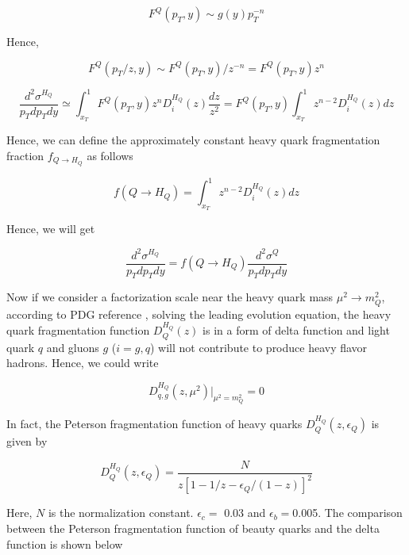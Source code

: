\begin{equation}
F^Q(p_T, y) \sim g(y) p_T^{-n}
\end{equation}

Hence,

\begin{equation}
F^Q(p_T/z, y) \sim F^Q(p_T, y)/z^{-n} = F^Q(p_T, y) z^n
\end{equation}


\begin{equation}
\frac{d^2\sigma^{H_Q}}{p_T dp_Tdy} \simeq \int_{x_T}^1 F^Q(p_T, y)  z^{n} D^{H_Q}_{i}(z) \frac{dz}{z^2} =F^Q(p_T, y)  \int_{x_T}^1  z^{n-2} D^{H_Q}_{i}(z) dz
\end{equation}



Hence, we can define the approximately constant heavy quark fragmentation fraction $f_{Q \rightarrow H_Q}$ as follows

\begin{equation}
f(Q \rightarrow H_Q) = \int_{x_T}^1 z^{n-2} D^{H_Q}_{i}(z) dz
\end{equation}

Hence, we will get 

\begin{equation}
\frac{d^2\sigma^{H_Q}}{p_T dp_T dy} = f(Q \rightarrow H_Q)  \frac{d^2\sigma^Q}{p_T dp_T dy}
\end{equation}

\fi

Now if we consider a factorization scale near the heavy quark mass $\mu^2 \rightarrow m_Q^2$, according to PDG reference \cite{AlphaTheoEx}, solving the leading evolution equation, the heavy quark fragmentation function $D_Q^{H_Q}(z)$ is in a form of delta function and light quark $q$ and gluons $g$ ($i = g, q$) will not contribute to produce heavy flavor hadrons. Hence, we could write

\begin{equation}
D^{H_Q}_{q,g}(z,\mu^2)|_{\mu^2=m_Q^2} = 0
\end{equation}

In fact, the Peterson fragmentation function of heavy quarks $D^{H_Q}_Q(z,\epsilon_Q)$ is given by \cite{Peterson}

\begin{equation}
D^{H_Q}_Q(z,\epsilon_Q) = \frac{N}{z[1-1/z-\epsilon_Q/(1-z)]^2}
\end{equation}

Here, $N$ is the normalization constant. $\epsilon_c = $ 0.03 and $\epsilon_b = $0.005. The comparison between the Peterson fragmentation function of beauty quarks and the delta function is shown below

